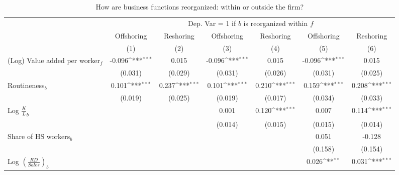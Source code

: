 \begin{table}[htbp] \footnotesize \centering
\def\sym#1{\ifmmode^{#1}\else\(^{#1}\)\fi}
\caption{How are business functions reorganized: within or outside the firm? \cite{costinot_2011} \label{tab:reg_how_costinot}}
\renewcommand{\arraystretch}{1}
\begin{tabular}{l*{6}{c}}
\toprule
&\multicolumn{6}{c}{Dep. Var = 1 if $ b $ is reorganized within $ f $} \\
\cmidrule(lr){2-7}
                &\multicolumn{1}{c}{Offshoring}&\multicolumn{1}{c}{Reshoring}&\multicolumn{1}{c}{Offshoring}&\multicolumn{1}{c}{Reshoring}&\multicolumn{1}{c}{Offshoring}&\multicolumn{1}{c}{Reshoring}\\\cmidrule(lr){2-2}\cmidrule(lr){3-3}\cmidrule(lr){4-4}\cmidrule(lr){5-5}\cmidrule(lr){6-6}\cmidrule(lr){7-7}
                &\multicolumn{1}{c}{(1)}         &\multicolumn{1}{c}{(2)}         &\multicolumn{1}{c}{(3)}         &\multicolumn{1}{c}{(4)}         &\multicolumn{1}{c}{(5)}         &\multicolumn{1}{c}{(6)}         \\
\midrule
(Log) Value added per worker$ _f$&   -0.096\sym{***}&    0.015         &   -0.096\sym{***}&    0.015         &   -0.096\sym{***}&    0.015         \\
                &  (0.031)         &  (0.029)         &  (0.031)         &  (0.026)         &  (0.031)         &  (0.025)         \\
\addlinespace
Routineness$ _b$&    0.101\sym{***}&    0.237\sym{***}&    0.101\sym{***}&    0.210\sym{***}&    0.159\sym{***}&    0.208\sym{***}\\
                &  (0.019)         &  (0.025)         &  (0.019)         &  (0.017)         &  (0.034)         &  (0.033)         \\
\addlinespace
Log $\frac{K}{L}_b$&                  &                  &    0.001         &    0.120\sym{***}&    0.007         &    0.114\sym{***}\\
                &                  &                  &  (0.014)         &  (0.015)         &  (0.015)         &  (0.014)         \\
\addlinespace
Share of HS workers$ _b$&                  &                  &                  &                  &    0.051         &   -0.128         \\
                &                  &                  &                  &                  &  (0.158)         &  (0.154)         \\
\addlinespace
Log $(\frac{RD}{Sales})_b$&                  &                  &                  &                  &    0.026\sym{**} &    0.031\sym{***}\\

\end{tabular}
\end{table}
